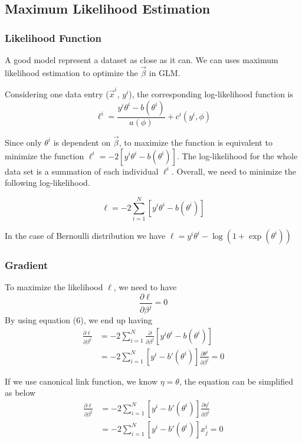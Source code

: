 \documentclass[12pt, oneside]{article}
\begin{document}
\subsection{Maximum Likelihood Estimation}

\subsubsection{Likelihood Function}
A good model represent a dataset as close as it can.
We can uses maximum likelihood estimation to optimize the $\vec{\beta}$ in GLM. 

Considering one data entry ($\vec{x}^i$, $y^i$), the corresponding log-likelihood function is $$\ell^i=\frac{y^i\theta^i-b(\theta^i)}{a(\phi)}+c^i(y^i, \phi)$$

Since only $\theta^i$ is dependent on $\vec{\beta}$, to maximize the function is equivalent to minimize the function $\ell^i=-2 \left[y^i\theta^i-b(\theta^i)\right]$. The log-likelihood for the whole data set is a summation of each individual $\ell^i$. Overall, we need to minimize the following log-likelihood.

\begin{equation}
\ell=-2\sum_{i=1}^{N} \left[y^i\theta^i-b(\theta^i)\right]
\end{equation}

In the case of Bernoulli distribution we have 
$\ell=y^i\theta^i-\log\left(1+\exp(\theta^i)\right)$

\subsubsection{Gradient}
To maximize the likelihood $\ell$, we need to have
$$\frac{\partial \ell}{\partial \beta^j}=0$$ 
By using equation (6), we end up having
\begin{align}
\frac{\partial \ell}{\partial \beta^j}&=-2\sum_{i=1}^{N}\frac{\partial }{\partial \beta^j} \left[y^i\theta^i-b(\theta^i)\right]\\
&=-2\sum_{i=1}^{N}\left[y^i-b'(\theta^i)\right]\frac{\partial \theta^i}{\partial\beta^j}=0
\end{align}

If we use canonical link function, we know $\eta=\theta$, the equation can be simplified as below
\begin{align}
\frac{\partial \ell}{\partial \beta^j}&=-2\sum_{i=1}^{N}\left[y^i-b'(\theta^i)\right]\frac{\partial \eta^i}{\partial\beta^j}\\
&=-2\sum_{i=1}^{N}\left[y^i-b'(\theta^i)\right]x^i_j=0
\end{align}
\end{document}
